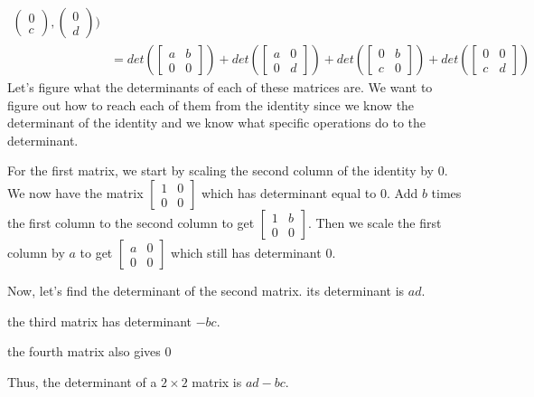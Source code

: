 \begin{example}
\begin{align*}
\begin{pmatrix}
        0 \\ c
    \end{pmatrix}, \begin{pmatrix}
        0 \\ d
    \end{pmatrix})\tag{by Multilinearity}\\
    &=det(\begin{bmatrix}
        a & b \\
        0 & 0
    \end{bmatrix})+det(\begin{bmatrix}
        a & 0 \\
        0 & d
    \end{bmatrix})+det(\begin{bmatrix}
        0 & b \\
        c & 0
    \end{bmatrix})+det(\begin{bmatrix}
        0 & 0 \\
        c & d
    \end{bmatrix})
    \end{align*}
    Let's figure what the determinants of each of these matrices are. We want to figure out how to reach each of them from the identity since we know the determinant of the identity and we know what specific operations do to the determinant. 
    
    For the first matrix, we start by scaling the second column of the identity by $0$. We now have the matrix $\begin{bmatrix}
        1 & 0\\
        0 & 0
    \end{bmatrix}$ which has determinant equal to $0$. Add $b$ times the first column to the second column to get $\begin{bmatrix}
        1 & b\\
        0 & 0
    \end{bmatrix}$. Then we scale the first column by $a$ to get $\begin{bmatrix}
        a & 0\\
        0 & 0
    \end{bmatrix}$ which still has determinant $0$.

    Now, let's find the determinant of the second matrix. its determinant is $ad$.

    the third matrix has determinant $-bc$.

    the fourth matrix also gives $0$

    Thus, the determinant of a $2\times 2$ matrix is $ad-bc$.
\end{example}
